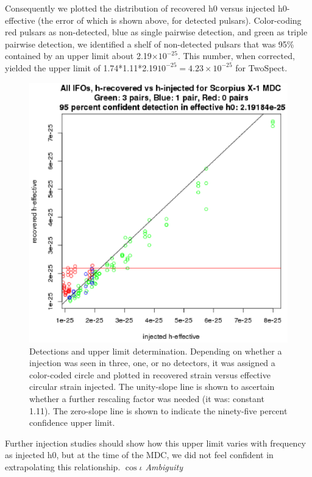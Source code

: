Consequently we plotted the distribution of recovered h0 versus injected h0-effective (the error of which is shown above, for detected pulsars). Color-coding red pulsars as non-detected, blue as single pairwise detection, and green as triple pairwise detection, we identified a shelf of non-detected pulsars that was 95\% contained by an upper limit about 2.19$\times 10^{-25}$. This number, when corrected, yielded the upper limit of 1.74*1.11*2.19$10^{-25} = 4.23\times 10^{-25}$ for TwoSpect.

\begin{figure}
\begin{center}
\includegraphics[width=0.3\paperwidth,height=0.2\paperheight]{HrecoveredVsHeffectiveFullUL.eps}
\caption{Detections and upper limit determination.
Depending on whether a injection was seen in three, one, or no detectors, it was assigned a color-coded circle and plotted in recovered strain versus effective circular strain injected.
The unity-slope line is shown to ascertain whether a further rescaling factor was needed (it was: constant 1.11).
The zero-slope line is shown to indicate the ninety-five percent confidence upper limit.
}
\end{center}
\end{figure}


Further injection studies should show how this upper limit varies with frequency as injected h0, but at the time of the MDC, we did not feel confident in extrapolating this relationship.
\newline
\textit{$\cos \iota$ Ambiguity}

